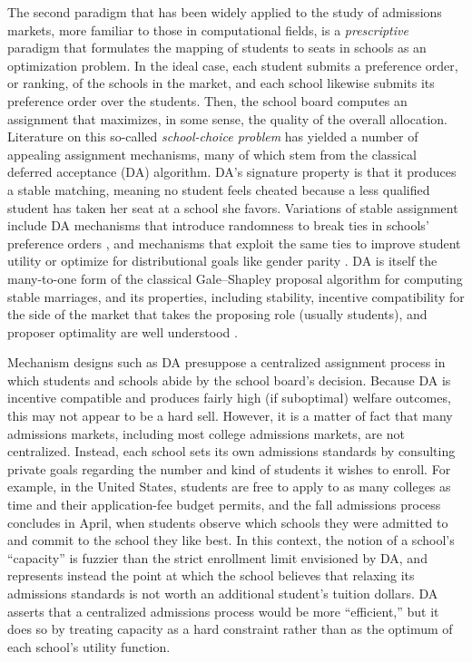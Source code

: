 \documentclass[12pt]{article}
\numberwithin{equation}{subsection}
\theoremstyle{definition}
\begin{document}
The second paradigm that has been widely applied to the study of admissions markets, more familiar to those in computational fields, is a \emph{prescriptive} paradigm that formulates the mapping of students to seats in schools as an optimization problem. In the ideal case, each student submits a preference order, or ranking, of the schools in the market, and each school likewise submits its preference order over the students. Then, the school board computes an assignment that maximizes, in some sense, the quality of the overall allocation. Literature on this so-called \emph{school-choice problem} has yielded a number of appealing assignment mechanisms, many of which stem from the classical deferred acceptance (DA) algorithm. DA's signature property is that it produces a stable matching, meaning no student feels cheated because a less qualified student has taken her seat at a school she favors. Variations of stable assignment include DA mechanisms that introduce randomness to break ties in schools' preference orders \parencite[][]{whatmatters}, and mechanisms that exploit the same ties to improve student utility \parencite[][]{expandingchoice} or optimize for distributional goals like gender parity \parencite[][]{distributionalgoals}. DA is itself the many-to-one form of the classical Gale--Shapley proposal algorithm for computing stable marriages, and its properties, including stability, incentive compatibility for the side of the market that takes the proposing role (usually students), and proposer optimality are well understood \parencite[][]{galeshapley1962, economicsofmatching}.

Mechanism designs such as DA presuppose a centralized assignment process in which students and schools abide by the school board's decision. Because DA is incentive compatible and produces fairly high (if suboptimal) welfare outcomes, this may not appear to be a hard sell. However, it is a matter of fact that many admissions markets, including most college admissions markets, are not centralized. Instead, each school sets its own admissions standards by consulting private goals regarding the number and kind of students it wishes to enroll. For example, in the United States, students are free to apply to as many colleges as time and their application-fee budget permits, and the fall admissions process concludes in April, when students observe which schools they were admitted to and commit to the school they like best. In this context, the notion of a school's ``capacity'' is fuzzier than the strict enrollment limit envisioned by DA, and represents instead the point at which the school believes that relaxing its admissions standards is not worth an additional student's tuition dollars. DA asserts that a centralized admissions process would be more ``efficient,'' but it does so by treating capacity as a hard constraint rather than as the optimum of each school's utility function. 
\end{document}
